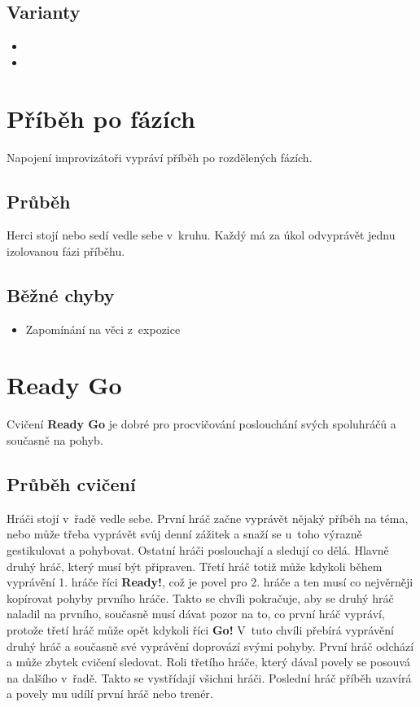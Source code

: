\subsection{Varianty} \begin{itemize}
\item {}
\item {}
\end{itemize}
 
 
 
\needspace{5cm} \section{Příběh po fázích} \label{příběh po fázích}  
 
Napojení improvizátoři vypráví příběh po rozdělených fázích. 
 
\subsection{ Průběh }  
Herci stojí nebo sedí vedle sebe v~kruhu. Každý má za úkol odvyprávět jednu izolovanou fázi příběhu.  
 
\subsection{ Běžné chyby }  
\begin{itemize}
\item  Zapomínání na věci z~expozice
\end{itemize}
 
 
 
 
 
\needspace{5cm} \section{Ready Go} \label{ready go} Cvičení \textbf{Ready Go} je dobré pro procvičování poslouchání svých spoluhráčů a současně na pohyb. 
 
\subsection{ Průběh cvičení } Hráči stojí v~řadě vedle sebe. První hráč začne vyprávět nějaký příběh na téma, nebo může třeba vyprávět svůj denní zážitek a snaží se u~toho výrazně gestikulovat a pohybovat. Ostatní hráči poslouchají a sledují co dělá. Hlavně druhý hráč, který musí být připraven. Třetí hráč totiž může kdykoli během vyprávění 1. hráče říci \textbf{Ready!}, což je povel pro 2. hráče a ten musí co nejvěrněji kopírovat pohyby prvního hráče. Takto se chvíli pokračuje, aby se druhý hráč naladil na prvního, současně musí dávat pozor na to, co první hráč vypráví, protože třetí hráč může opět kdykoli říci \textbf{Go!} V~tuto chvíli přebírá vyprávění druhý hráč a současně své vyprávění doprovází svými pohyby. První hráč odchází a může zbytek cvičení sledovat. Roli třetího hráče, který dával povely se posouvá na dalšího v~řadě. Takto se vystřídají všichni hráči. Poslední hráč příběh uzavírá a povely mu udílí první hráč nebo trenér. 
 
